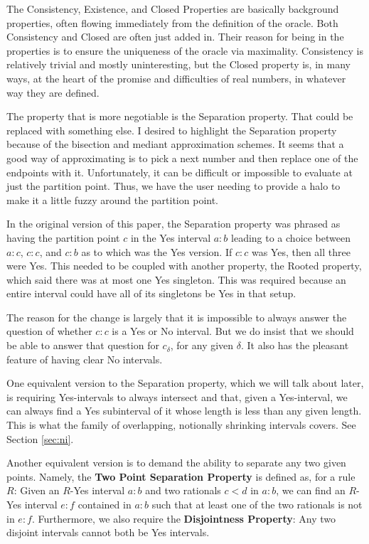 \documentclass[12pt]{article}
\begin{document}
The Consistency, Existence, and Closed Properties are basically background properties, often flowing immediately from the definition of the oracle. Both Consistency and Closed are often just added in. Their reason for being in the properties is to ensure the uniqueness of the oracle via maximality. Consistency is relatively trivial and mostly uninteresting, but the Closed property is, in many ways, at the heart of the promise and difficulties of real numbers, in whatever way they are defined. 

The property that is more negotiable is the Separation property. That could be replaced with something else. I desired to highlight the Separation property because of the bisection and mediant approximation schemes. It seems that a good way of approximating is to pick a next number and then replace one of the endpoints with it. Unfortunately, it can be difficult or impossible to evaluate at just the partition point. Thus, we have the user needing to provide a halo to make it a little fuzzy around the partition point. 

In the original version of this paper, the Separation property was phrased as having the partition point $c$ in the Yes interval $a:b$ leading to a choice between $a:c$, $c:c$, and $c:b$ as to which was the Yes version. If $c:c$ was Yes, then all three were Yes. This needed to be coupled with another property, the Rooted property, which said there was at most one Yes singleton. This was required because an entire interval could have all of its singletons be Yes in that setup. 

The reason for the change is largely that it is impossible to always answer the question of whether $c:c$ is a Yes or No interval. But we do insist that we should be able to answer that question for $c_\delta$, for any given $\delta$. It also has the pleasant feature of having clear No intervals. 

One equivalent version to the Separation property, which we will talk about later, is requiring Yes-intervals to always intersect and that, given a Yes-interval, we can always find a Yes subinterval of it whose length is less than any given length. This is what the family of overlapping, notionally shrinking intervals covers. See Section \ref{sec:ni}.

Another equivalent version is to demand the ability to separate any two given points. Namely, the \textbf{Two Point Separation Property} is defined as, for a rule $R$: Given an $R$-Yes interval $a:b$ and two rationals $c < d$ in $a:b$, we can find an $R$-Yes interval $e:f$ contained in $a:b$ such that at least one of the two rationals is not in $e:f$. Furthermore, we also require the \textbf{Disjointness Property}: Any two disjoint intervals cannot both be Yes intervals. 
\end{document}
